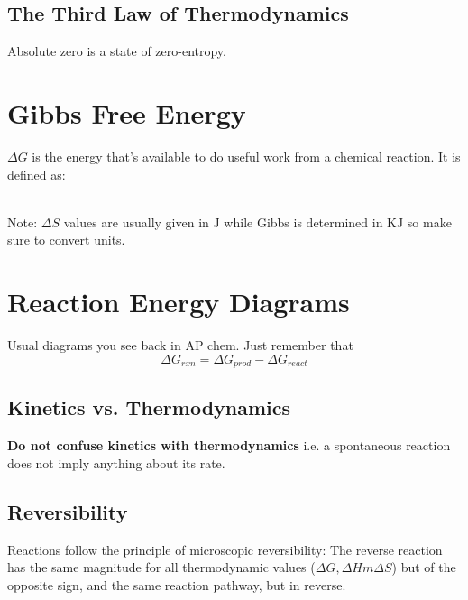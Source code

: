 \documentclass[../GChemReview.tex]{subfiles}
\begin{document}
	\subsection{The Third Law of Thermodynamics}
	
	Absolute zero is a state of zero-entropy. 
	
	\section{Gibbs Free Energy}
	
	$ \Delta G $ is the energy that's available to do useful work from a chemical reaction. It is defined as:
	
	\hfil\\
	Note: $ \Delta S $ values are usually given in J while Gibbs is determined in KJ so make sure to convert units.
	
	\section{Reaction Energy Diagrams}
	
	Usual diagrams you see back in AP chem. Just remember that 
	\[ \Delta G_{rxn} = \Delta G_{prod} - \Delta G_{react} \]
	
	\subsection{Kinetics vs. Thermodynamics}
	
	\textbf{Do not confuse kinetics with thermodynamics} i.e. a spontaneous reaction does not imply anything about its rate. 
	
	\subsection{Reversibility}
	
	Reactions follow the principle of microscopic reversibility: The reverse reaction has the same magnitude for all thermodynamic values ($ \Delta G, \Delta Hm \Delta S $) but of the opposite sign, and the same reaction pathway, but in reverse. 
	
\end{document}
